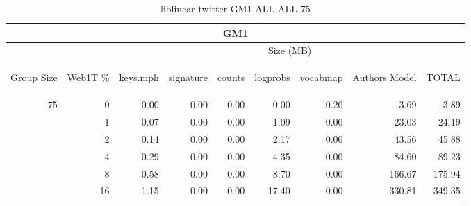 \begin{center}
\begin{table}[htbp]
\begin{tabular}{ | r | r | r | r | r | r | r | r | r |}
\hline
\multicolumn{9}{|c|}{GM1}\\
\hline
 & & \multicolumn{7}{|c|}{Size (MB)}\\ \cline{3-9}
\begin{sideways}Group Size\end{sideways} & \begin{sideways}Web1T \% \end{sideways} & \begin{sideways}keys.mph\end{sideways} & \begin{sideways}signature\end{sideways} & \begin{sideways}counts\end{sideways} & \begin{sideways}logprobs\end{sideways} & \begin{sideways}vocabmap\end{sideways} & \begin{sideways}Authors Model \end{sideways} & \begin{sideways}TOTAL\end{sideways}\\
\hline
\multirow{5}{*}{75}
 & 0 & 0.00 & 0.00 & 0.00 & 0.00 & 0.20 & 3.69 & 3.89\\ \cline{2-9}
 & 1 & 0.07 & 0.00 & 0.00 & 1.09 & 0.00 & 23.03 & 24.19\\ \cline{2-9}
 & 2 & 0.14 & 0.00 & 0.00 & 2.17 & 0.00 & 43.56 & 45.88\\ \cline{2-9}
 & 4 & 0.29 & 0.00 & 0.00 & 4.35 & 0.00 & 84.60 & 89.23\\ \cline{2-9}
 & 8 & 0.58 & 0.00 & 0.00 & 8.70 & 0.00 & 166.67 & 175.94\\ \cline{2-9}
 & 16 & 1.15 & 0.00 & 0.00 & 17.40 & 0.00 & 330.81 & 349.35\\ \cline{2-9}
\hline
\end{tabular}
\caption{liblinear-twitter-GM1-ALL-ALL-75}
\label{table:liblinear-twitter-GM1-ALL-ALL-75}
\end{table}
\end{center}

